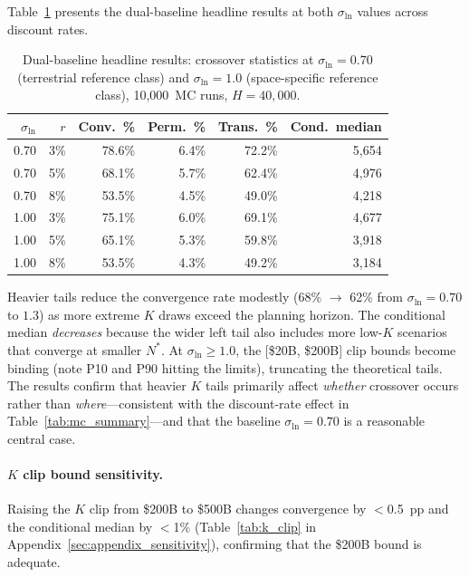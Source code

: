 \documentclass[preprint,12pt]{elsarticle}
\begin{document}
Table~\ref{tab:dual_baseline} presents the dual-baseline headline results at both $\sigma_{\ln}$ values across discount rates.

\begin{table}[htbp]
\centering
\caption{Dual-baseline headline results: crossover statistics at $\sigma_{\ln} = 0.70$ (terrestrial reference class) and $\sigma_{\ln} = 1.0$ (space-specific reference class), 10{,}000~MC runs, $H = 40{,}000$.}
\label{tab:dual_baseline}
\small
\begin{tabular}{@{}rrrrrr@{}}
\toprule
$\sigma_{\ln}$ & $r$ & Conv.\ \% & Perm.\ \% & Trans.\ \% & Cond.\ median \\
\midrule
0.70 & 3\%  & 78.6\% & 6.4\%  & 72.2\% & 5{,}654 \\
0.70 & 5\%  & 68.1\% & 5.7\%  & 62.4\% & 4{,}976 \\
0.70 & 8\%  & 53.5\% & 4.5\%  & 49.0\% & 4{,}218 \\
\midrule
1.00 & 3\%  & 75.1\% & 6.0\%  & 69.1\% & 4{,}677 \\
1.00 & 5\%  & 65.1\% & 5.3\%  & 59.8\% & 3{,}918 \\
1.00 & 8\%  & 53.5\% & 4.3\%  & 49.2\% & 3{,}184 \\
\bottomrule
\end{tabular}
\end{table}

Heavier tails reduce the convergence rate modestly (68\% $\to$ 62\% from $\sigma_{\ln} = 0.70$ to $1.3$) as more extreme $K$ draws exceed the planning horizon. The conditional median \emph{decreases} because the wider left tail also includes more low-$K$ scenarios that converge at smaller $N^*$. At $\sigma_{\ln} \geq 1.0$, the [\$20B, \$200B] clip bounds become binding (note P10 and P90 hitting the limits), truncating the theoretical tails. The results confirm that heavier $K$ tails primarily affect \emph{whether} crossover occurs rather than \emph{where}---consistent with the discount-rate effect in Table~\ref{tab:mc_summary}---and that the baseline $\sigma_{\ln} = 0.70$ is a reasonable central case.

\paragraph{$K$ clip bound sensitivity.} Raising the $K$ clip from \$200B to \$500B changes convergence by $<$0.5~pp and the conditional median by $<$1\% (Table~\ref{tab:k_clip} in Appendix~\ref{sec:appendix_sensitivity}), confirming that the \$200B bound is adequate.
\end{document}
